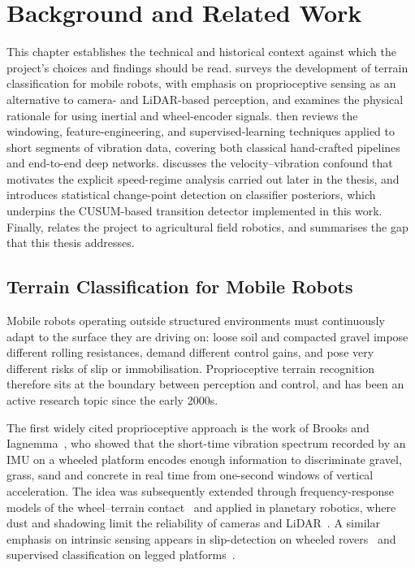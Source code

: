 \chapter{Background and Related Work}
\label{ch:background}

This chapter establishes the technical and historical context against which the project's choices and findings should be read.  surveys the development of terrain classification for mobile robots, with emphasis on proprioceptive sensing as an alternative to camera- and LiDAR-based perception, and  examines the physical rationale for using inertial and wheel-encoder signals.  then reviews the windowing, feature-engineering, and supervised-learning techniques applied to short segments of vibration data, covering both classical hand-crafted pipelines and end-to-end deep networks.  discusses the velocity--vibration confound that motivates the explicit speed-regime analysis carried out later in the thesis, and  introduces statistical change-point detection on classifier posteriors, which underpins the CUSUM-based transition detector implemented in this work. Finally,  relates the project to agricultural field robotics, and  summarises the gap that this thesis addresses.

\section{Terrain Classification for Mobile Robots}
\label{sec:bg-history}

Mobile robots operating outside structured environments must continuously adapt to the surface they are driving on: loose soil and compacted gravel impose different rolling resistances, demand different control gains, and pose very different risks of slip or immobilisation. Proprioceptive terrain recognition therefore sits at the boundary between perception and control, and has been an active research topic since the early 2000s.

The first widely cited proprioceptive approach is the work of Brooks and Iagnemma~\cite{Brooks2005}, who showed that the short-time vibration spectrum recorded by an IMU on a wheeled platform encodes enough information to discriminate gravel, grass, sand and concrete in real time from one-second windows of vertical acceleration. The idea was subsequently extended through frequency-response models of the wheel--terrain contact~\cite{DuPont2008} and applied in planetary robotics, where dust and shadowing limit the reliability of cameras and LiDAR~\cite{Weiss2011,Otsu2016}. A similar emphasis on intrinsic sensing appears in slip-detection on wheeled rovers~\cite{Ojeda2006} and supervised classification on legged platforms~\cite{Bermudez2012}.

